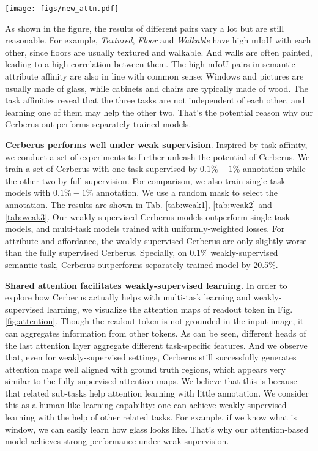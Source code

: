 \documentclass[10pt,twocolumn,letterpaper]{article}
\begin{document}
\begin{figure*}[htbp]
  \centering
  \texttt{[image: figs/new\_attn.pdf]}
  \caption{\textbf{Visualization of attention weights}. We analyze the self-attention weights of the readout token on different task heads. Interestingly, in the weakly-supervised setting, learned attention weights still well align with ground truth regions.}
  \label{fig:attention} 
\end{figure*}

As shown in the figure, the results of different pairs vary a lot but are still reasonable. For example, \emph{Textured}, \emph{Floor} and \emph{Walkable} have high mIoU with each other, since floors are usually textured and walkable. And walls are often painted, leading to a high correlation between them. The high mIoU pairs in semantic-attribute affinity are also in line with common sense: Windows and pictures are usually made of glass, while cabinets and chairs are typically made of wood. The task affinities reveal that the three tasks are not independent of each other, and learning one of them may help the other two. That's the potential reason why our Cerberus out-performs separately trained models. 




\textbf{Cerberus performs well under weak supervision}. Inspired by task affinity, we conduct a set of experiments to further unleash the potential of Cerberus. We train a set of Cerberus with one task supervised by $0.1\%-1\%$ annotation while the other two by full supervision. For comparison, we also train single-task models with $0.1\%-1\%$ annotation. We use a random mask to select the annotation. The results are shown in Tab. \ref{tab:weak1}, \ref{tab:weak2} and \ref{tab:weak3}. Our weakly-supervised Cerberus models outperform single-task models, and multi-task models trained with uniformly-weighted losses. For attribute and affordance, the weakly-supervised Cerberus are only slightly worse than the fully supervised Cerberus. Specially,  on 0.1\% weakly-supervised semantic task, Cerberus outperforms separately trained model by 20.5\%. 

\textbf{Shared attention facilitates weakly-supervised learning.} In order to explore how Cerberus actually helps with multi-task learning and weakly-supervised learning, we visualize the attention maps of readout token in Fig.\ref{fig:attention}. Though the readout token is not grounded in the input image, it can aggregates information from other tokens. As can be seen, different heads of the last attention layer aggregate different task-specific features. And we observe that, even for weakly-supervised settings, Cerberus still successfully generates attention maps well aligned with ground truth regions, which appears very similar to the fully supervised attention maps. We believe that this is because that related sub-tasks help attention learning with little annotation. We consider this as a human-like learning capability: one can achieve weakly-supervised learning with the help of other related tasks. For example, if we know what is window, we can easily learn how glass looks like. That's why our attention-based model achieves strong performance under weak supervision.
\end{document}

